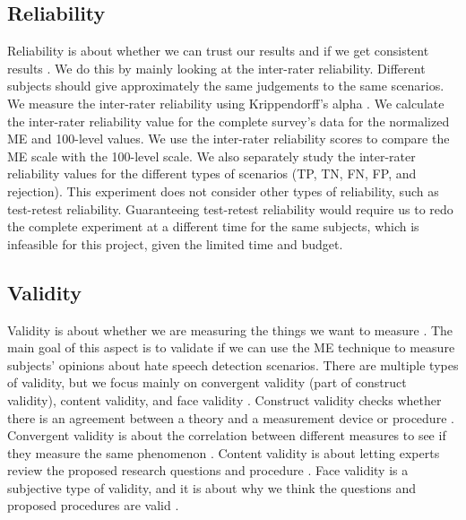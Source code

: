 \subsection{Reliability}
Reliability is about whether we can trust our results and if we get consistent results \citep{fitzner2007reliability}.
%
We do this by mainly looking at the inter-rater reliability.
%
Different subjects should give approximately the same judgements to the same scenarios.
%
We measure the inter-rater reliability using Krippendorff's alpha \citep{maddalena2017crowdsourcing, krippendorff2004reliability}.
%
We calculate the inter-rater reliability value for the complete survey's data for the normalized ME and 100-level values.
%
We use the inter-rater reliability scores to compare the ME scale with the 100-level scale.
%
We also separately study the inter-rater reliability values for the different types of scenarios (TP, TN, FN, FP, and rejection).
%
This experiment does not consider other types of reliability, such as test-retest reliability.
%
Guaranteeing test-retest reliability would require us to redo the complete experiment at a different time for the same subjects, which is infeasible for this project, given the limited time and budget.

\subsection{Validity}
\label{sec:analysis-validity}
Validity is about whether we are measuring the things we want to measure \citep{fitzner2007reliability}.
%
The main goal of this aspect is to validate if we can use the ME technique to measure subjects' opinions about hate speech detection scenarios.
%
There are multiple types of validity, but we focus mainly on convergent validity (part of construct validity), content validity, and face validity \citep{fitzner2007reliability}.
%
Construct validity checks whether there is an agreement between a theory and a measurement device or procedure \citep{fitzner2007reliability}.
%
Convergent validity is about the correlation between different measures to see if they measure the same phenomenon \citep{fitzner2007reliability}.
%
Content validity is about letting experts review the proposed research questions and procedure \citep{fitzner2007reliability}.
%
Face validity is a subjective type of validity, and it is about why we think the questions and proposed procedures are valid \citep{fitzner2007reliability}.
%

